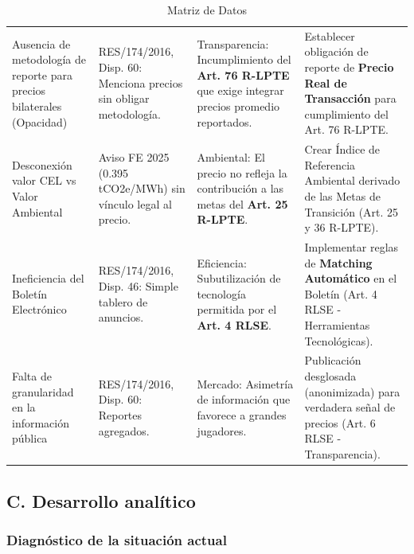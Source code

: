 \documentclass{cel}
\begin{document}
\vspace{0.3cm}
\begin{tabladoradoLargo}
\renewcommand{\tabularxcolumn}[1]{p{#1}}
\begin{xltabular}{\textwidth}{|X|X|X|X|}
\caption{Matriz de Datos} \\
\toprule
{}  &  &  &  \\
\midrule
\endhead
Ausencia de metodología de reporte para precios bilaterales (Opacidad) & RES/174/2016, Disp. 60: Menciona \textquotedbl{}precios\textquotedbl{} sin obligar metodología. & Transparencia: Incumplimiento del \textbf{Art. 76 R-LPTE} que exige integrar \textquotedbl{}precios promedio reportados\textquotedbl{}. & Establecer obligación de reporte de \textbf{Precio Real de Transacción} para cumplimiento del Art. 76 R-LPTE. \\ \hline
Desconexión valor CEL vs Valor Ambiental & Aviso FE 2025 (0.395 tCO2e/MWh) sin vínculo legal al precio. & Ambiental: El precio no refleja la contribución a las metas del \textbf{Art. 25 R-LPTE}. & Crear \textquotedbl{}Índice de Referencia Ambiental\textquotedbl{} derivado de las Metas de Transición (Art. 25 y 36 R-LPTE). \\ \hline
Ineficiencia del Boletín Electrónico & RES/174/2016, Disp. 46: Simple tablero de anuncios. & Eficiencia: Subutilización de tecnología permitida por el \textbf{Art. 4 RLSE}. & Implementar reglas de \textbf{Matching Automático} en el Boletín (Art. 4 RLSE - Herramientas Tecnológicas). \\ \hline
Falta de granularidad en la información pública & RES/174/2016, Disp. 60: Reportes agregados. & Mercado: Asimetría de información que favorece a grandes jugadores. & Publicación desglosada (anonimizada) para verdadera señal de precios (Art. 6 RLSE - Transparencia). \\ \hline
\bottomrule
\end{xltabular}
\end{tabladoradoLargo}

\subsection{C. Desarrollo analítico}
\nopagebreak

\subsubsection{Diagnóstico de la situación actual}
\nopagebreak
\end{document}
